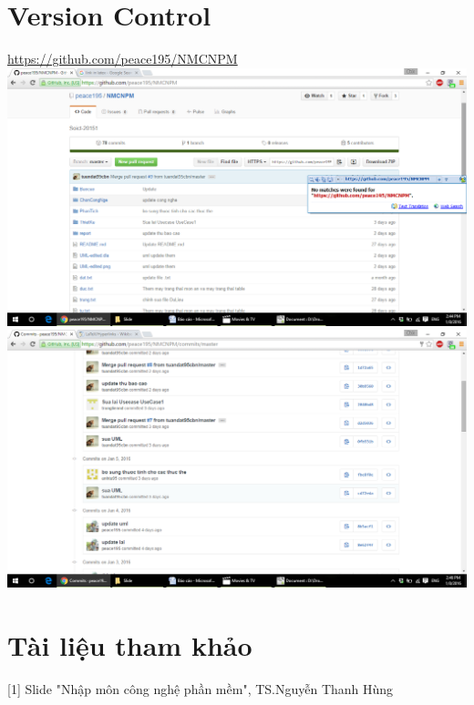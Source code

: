 \documentclass[a4paper,12pt]{report}
\begin{document}
\chapter{Version Control}
\begin{center}
\hyperref[label_name]{https://github.com/peace195/NMCNPM}\\
\includegraphics[scale=0.4]{vc1.png}\\
\includegraphics[scale=0.4]{vc2.png}
\end{center}
\chapter*{Tài liệu tham khảo}
{}
[1] Slide "Nhập môn công nghệ phần mềm", TS.Nguyễn Thanh Hùng
\end{document}
